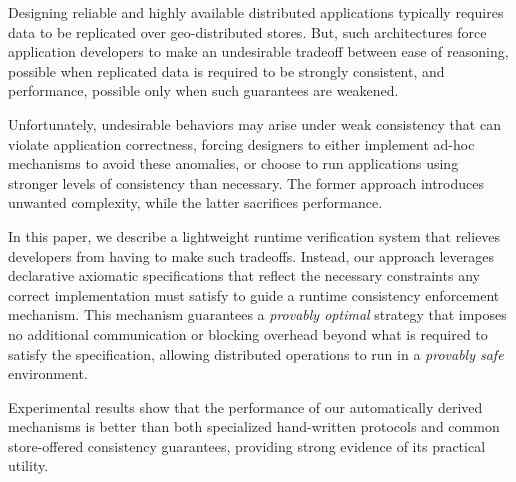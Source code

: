 
  Designing reliable and highly available distributed applications
  typically requires data to be replicated over geo-distributed
  stores.  But, such architectures force application developers to
  make an undesirable tradeoff between ease of reasoning, possible
  when replicated data is required to be strongly consistent, and
  performance, possible only when such guarantees are weakened.

  Unfortunately, undesirable behaviors may arise under weak
  consistency that can violate application correctness, forcing
  designers to either implement ad-hoc mechanisms to avoid these
  anomalies, or choose to run applications using stronger levels of
  consistency than necessary. The former approach introduces unwanted
  complexity, while the latter sacrifices performance.

  In this paper, we describe a lightweight runtime verification system
  that relieves developers from having to make such tradeoffs.
  Instead, our approach leverages declarative axiomatic specifications
  that reflect the necessary constraints any correct implementation
  must satisfy to guide a runtime consistency enforcement mechanism.
  This mechanism guarantees a \emph{provably optimal} strategy that
  imposes no additional communication or blocking overhead beyond what
  is required to satisfy the specification, allowing distributed
  operations to run in a \emph{provably safe} environment.

  Experimental results show that the performance of our automatically
  derived mechanisms is better than both specialized hand-written
  protocols and common store-offered consistency guarantees, providing
  strong evidence of its practical utility.
